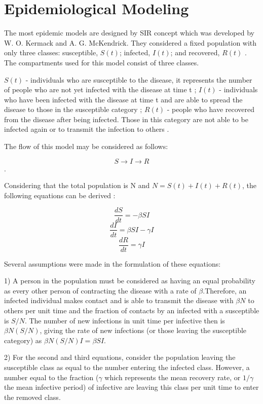 \chapter*{Epidemiological Modeling}


The most epidemic models are designed by SIR concept which was developed by W. O. Kermack and A. G. McKendrick. They considered a fixed population with only three classes: susceptible, $S(t)$; infected, $I(t)$; and recovered, $R(t)$ \cite{per14}. The compartments used for this model consist of three classes.

$S(t)$ - individuals who are susceptible to the disease, it represents the number of people who are not yet infected with the disease at time t \cite{per14};
$I(t)$ - individuals who have been infected with the disease at time t and are able to spread the disease to those in the susceptible category \cite{per14};
$R(t)$ - people who have recovered from the disease after being infected. Those in this category are not able to be infected again or to transmit the infection to others \cite{per14}.

The flow of this model may be considered as follows:

$$S \rightarrow I \rightarrow R$$.

Considering that the total population is N and $N = S(t) + I(t) + R(t)$, the following equations can be derived \cite{per15}:

$$\frac{dS}{dt} = -\beta S I$$
$$\frac{dI}{dt} = \beta S I - \gamma I$$
$$\frac{dR}{dt} = \gamma I$$

Several assumptions were made in the formulation of these equations:

1) A person in the population must be considered as having an equal probability as every other person of contracting the disease with a rate of  $\beta$.Therefore, an infected individual makes contact and is able to transmit the disease with $\beta N$ to others per unit time and the fraction of contacts by an infected with a susceptible is $S/N$. The number of new infections in unit time per infective then is $\beta N (S/N)$, giving the rate of new infections (or those leaving the susceptible category) as $\beta N (S/N) I = \beta S I$. \cite{per14}

2) For the second and third equations, consider the population leaving the susceptible class as equal to the number entering the infected class. However, a number equal to the fraction ($\gamma$ which represents the mean recovery rate, or $1/\gamma$ the mean infective period) of infective are leaving this class per unit time to enter the removed class.

